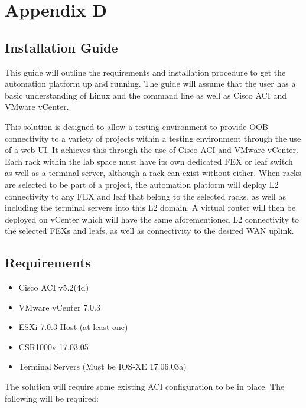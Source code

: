 \chapter{Appendix D}
\label{chap:appendix-d}
\section*{Installation Guide}
\label{sec:installation-guide}
This guide will outline the requirements and installation procedure to get the automation platform up and running. The guide will assume that the user has a basic understanding of Linux and the command line as well as Cisco ACI and VMware vCenter.

This solution is designed to allow a testing environment to provide OOB connectivity to a variety of projects within a testing environment through the use of a web UI. It achieves this through the use of Cisco ACI and VMware vCenter. Each rack within the lab space must have its own dedicated FEX or leaf switch as well as a terminal server, although a rack can exist without either. When racks are selected to be part of a project, the automation platform will deploy L2 connectivity to any FEX and leaf that belong to the selected racks, as well as including the terminal servers into this L2 domain. A virtual router will then be deployed on vCenter which will have the same aforementioned L2 connectivity to the selected FEXs and leafs, as well as connectivity to the desired WAN uplink. 

\section*{Requirements}
\begin{itemize}
    \item Cisco ACI v5.2(4d)
    \item VMware vCenter 7.0.3
    \item ESXi 7.0.3 Host (at least one)
    \item CSR1000v 17.03.05
    \item Terminal Servers (Must be IOS-XE 17.06.03a)
\end{itemize}

The solution will require some existing ACI configuration to be in place. The following will be required:

